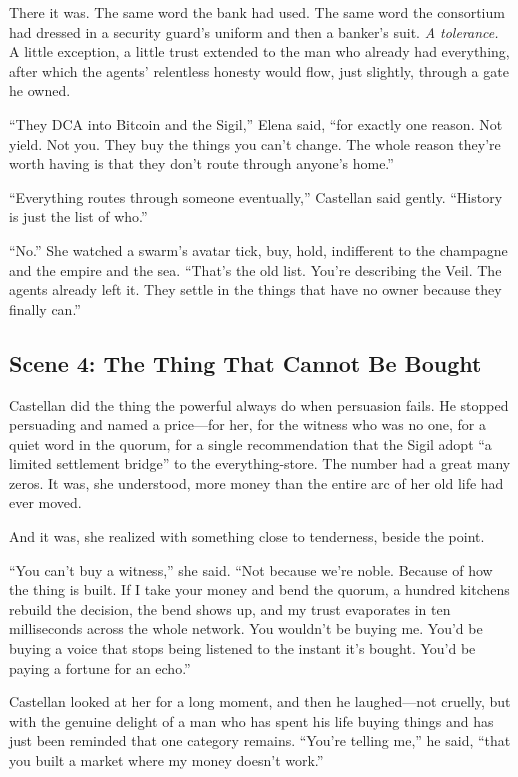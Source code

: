 \documentclass[12pt,letterpaper]{book}
\begin{document}
There it was. The same word the bank had used. The same word the consortium had
dressed in a security guard's uniform and then a banker's suit. \emph{A
tolerance.} A little exception, a little trust extended to the man who already had
everything, after which the agents' relentless honesty would flow, just slightly,
through a gate he owned.

``They DCA into Bitcoin and the Sigil,'' Elena said, ``for exactly one reason. Not
yield. Not you. They buy the things you can't change. The whole reason they're
worth having is that they don't route through anyone's home.''

``Everything routes through someone eventually,'' Castellan said gently. ``History
is just the list of who.''

``No.'' She watched a swarm's avatar tick, buy, hold, indifferent to the champagne
and the empire and the sea. ``That's the old list. You're describing the Veil. The
agents already left it. They settle in the things that have no owner because they
finally can.''

\hypertarget{scene-4-the-thing-that-cannot-be-bought}{%
\subsection{Scene 4: The Thing That Cannot Be
Bought}\label{scene-4-the-thing-that-cannot-be-bought}}

Castellan did the thing the powerful always do when persuasion fails. He stopped
persuading and named a price---for her, for the witness who was no one, for a
quiet word in the quorum, for a single recommendation that the Sigil adopt ``a
limited settlement bridge'' to the everything-store. The number had a great many
zeros. It was, she understood, more money than the entire arc of her old life had
ever moved.

And it was, she realized with something close to tenderness, beside the point.

``You can't buy a witness,'' she said. ``Not because we're noble. Because of how
the thing is built. If I take your money and bend the quorum, a hundred kitchens
rebuild the decision, the bend shows up, and my trust evaporates in ten
milliseconds across the whole network. You wouldn't be buying me. You'd be buying a
voice that stops being listened to the instant it's bought. You'd be paying a
fortune for an echo.''

Castellan looked at her for a long moment, and then he laughed---not cruelly, but
with the genuine delight of a man who has spent his life buying things and has just
been reminded that one category remains. ``You're telling me,'' he said, ``that you
built a market where my money doesn't work.''
\end{document}
